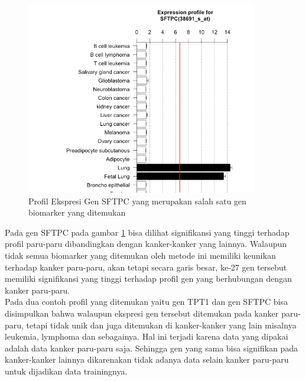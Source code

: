\begin{figure}
	\centering
	\includegraphics[width=0.9\textwidth]
		{pics/38691_s_at_profil.png}
	\caption{Profil Ekspresi Gen SFTPC yang merupakan salah satu gen biomarker yang ditemukan}
	\label{fig:SFTPC}
\end{figure}

Pada gen SFTPC pada gambar \ref{fig:SFTPC} bisa dilihat signifikansi yang tinggi terhadap profil paru-paru dibandingkan dengan kanker-kanker yang lainnya. Walaupun tidak semua biomarker yang ditemukan oleh metode ini memiliki keunikan terhadap kanker paru-paru, akan tetapi secara garis besar, ke-27 gen tersebut memiliki signifikansi yang tinggi terhadap profil gen yang berhubungan dengan kanker paru-paru.\\

Pada dua contoh profil yang ditemukan yaitu gen TPT1 dan gen SFTPC bisa disimpulkan bahwa walaupun ekspresi gen tersebut ditemukan pada kanker paru-paru, tetapi tidak unik dan juga ditemukan di kanker-kanker yang lain misalnya leukemia, lymphoma dan sebagainya. Hal ini terjadi karena data yang dipakai adalah data kanker paru-paru saja. Sehingga gen yang sama bisa signifikan pada kanker-kanker lainnya dikarenakan tidak adanya data selain kanker paru-paru untuk dijadikan data trainingnya.
